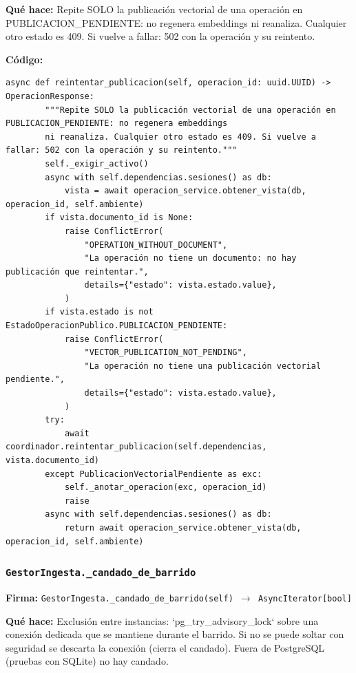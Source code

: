 \documentclass[11pt,a4paper]{article}
\begin{document}
\textbf{Qué hace:} Repite SOLO la publicación vectorial de una operación en PUBLICACION\_PENDIENTE: no regenera embeddings
ni reanaliza. Cualquier otro estado es 409. Si vuelve a fallar: 502 con la operación y su reintento.

\textbf{Código:}
\begin{lstlisting}
async def reintentar_publicacion(self, operacion_id: uuid.UUID) -> OperacionResponse:
        """Repite SOLO la publicación vectorial de una operación en PUBLICACION_PENDIENTE: no regenera embeddings
        ni reanaliza. Cualquier otro estado es 409. Si vuelve a fallar: 502 con la operación y su reintento."""
        self._exigir_activo()
        async with self.dependencias.sesiones() as db:
            vista = await operacion_service.obtener_vista(db, operacion_id, self.ambiente)
        if vista.documento_id is None:
            raise ConflictError(
                "OPERATION_WITHOUT_DOCUMENT",
                "La operación no tiene un documento: no hay publicación que reintentar.",
                details={"estado": vista.estado.value},
            )
        if vista.estado is not EstadoOperacionPublico.PUBLICACION_PENDIENTE:
            raise ConflictError(
                "VECTOR_PUBLICATION_NOT_PENDING",
                "La operación no tiene una publicación vectorial pendiente.",
                details={"estado": vista.estado.value},
            )
        try:
            await coordinador.reintentar_publicacion(self.dependencias, vista.documento_id)
        except PublicacionVectorialPendiente as exc:
            self._anotar_operacion(exc, operacion_id)
            raise
        async with self.dependencias.sesiones() as db:
            return await operacion_service.obtener_vista(db, operacion_id, self.ambiente)
\end{lstlisting}

\subsubsection*{\texttt{GestorIngesta.\_candado\_de\_barrido}}
\textbf{Firma:} \texttt{GestorIngesta.\_candado\_de\_barrido(self) $\rightarrow$ AsyncIterator[bool]}

\textbf{Qué hace:} Exclusión entre instancias: `pg\_try\_advisory\_lock` sobre una conexión dedicada que se mantiene durante
el barrido. Si no se puede soltar con seguridad se descarta la conexión (cierra el candado). Fuera de
PostgreSQL (pruebas con SQLite) no hay candado.
\end{document}

